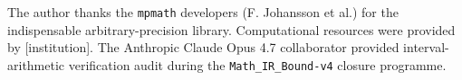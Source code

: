 \begin{acknowledgments}
The author thanks the \texttt{mpmath} developers (F. Johansson et al.) for
the indispensable arbitrary-precision library. Computational resources were
provided by [institution]. The Anthropic Claude Opus 4.7 collaborator
provided interval-arithmetic verification audit during the
\texttt{Math\_IR\_Bound-v4} closure programme.
\end{acknowledgments}





